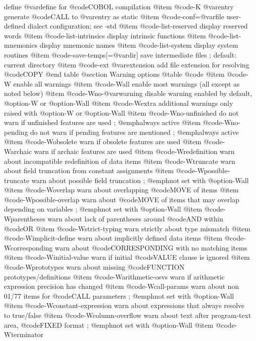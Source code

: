 define @var{define} for @code{COBOL} compilation
@item @code{-K @var{entry}}
generate @code{CALL} to @var{entry} as static
@item @code{-conf=@var{file}}
user-defined dialect configuration; see -std
@item @code{-list-reserved}
display reserved words
@item @code{-list-intrinsics}
display intrinsic functions
@item @code{-list-mnemonics}
display mnemonic names
@item @code{-list-system}
display system routines
@item @code{-save-temps[=@var{dir}]}
save intermediate files
; default: current directory
@item @code{-ext @var{extension}}
add file extension for resolving @code{COPY}
@end table
@section Warning options
@table @code
@item @code{-W}
enable all warnings
@item @code{-Wall}
enable most warnings (all except as noted below)
@item @code{-Wno-@var{warning}}
disable warning enabled by default, @option{-W} or @option{-Wall}
@item @code{-Wextra}
additional warnings only raised with @option{-W} or @option{-Wall}
@item @code{-Wno-unfinished}
do not warn if unfinished features are used
; @emph{always active}
@item @code{-Wno-pending}
do not warn if pending features are mentioned
; @emph{always active}
@item @code{-Wobsolete}
warn if obsolete features are used
@item @code{-Warchaic}
warn if archaic features are used
@item @code{-Wredefinition}
warn about incompatible redefinition of data items
@item @code{-Wtruncate}
warn about field truncation from constant assignments
@item @code{-Wpossible-truncate}
warn about possible field truncation
; @emph{not set with @option{-Wall}}
@item @code{-Woverlap}
warn about overlapping @code{MOVE} of items
@item @code{-Wpossible-overlap}
warn about @code{MOVE} of items that may overlap depending on variables
; @emph{not set with @option{-Wall}}
@item @code{-Wparentheses}
warn about lack of parentheses around @code{AND} within @code{OR}
@item @code{-Wstrict-typing}
warn strictly about type mismatch
@item @code{-Wimplicit-define}
warn about implicitly defined data items
@item @code{-Wcorresponding}
warn about @code{CORRESPONDING} with no matching items
@item @code{-Winitial-value}
warn if initial @code{VALUE} clause is ignored
@item @code{-Wprototypes}
warn about missing @code{FUNCTION} prototypes/definitions
@item @code{-Warithmetic-osvs}
warn if arithmetic expression precision has changed
@item @code{-Wcall-params}
warn about non 01/77 items for @code{CALL} parameters
; @emph{not set with @option{-Wall}}
@item @code{-Wconstant-expression}
warn about expressions that always resolve to true/false
@item @code{-Wcolumn-overflow}
warn about text after program-text area, @code{FIXED} format
; @emph{not set with @option{-Wall}}
@item @code{-Wterminator}
